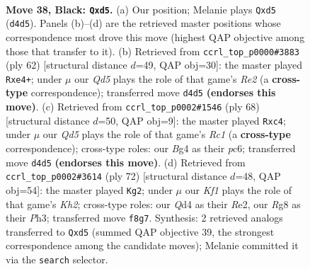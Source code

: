 \documentclass[11pt]{article}
\begin{document}
\clearpage

\begin{figure}[p]\centering
\begin{subfigure}{0.46\textwidth}\centering
\resizebox{\linewidth}{!}{%
\newchessgame
\chessboard[
  setfen={5kr1/p4p2/7p/2PBp1p1/3q2b1/8/P1K5/8 b - - 5 38},
  showmover=false,
  pgfstyle=straightmove, color=movearrow, markmove={d4-d5}
]}
\caption{}
\end{subfigure}\hfill
\begin{subfigure}{0.46\textwidth}\centering
\resizebox{\linewidth}{!}{%
\newchessgame
\chessboard[
  setfen={3r4/1p6/p3k2p/6p1/P3b3/1P6/2P1RKP1/8 w - - 0 32},
  showmover=false,
  pgfstyle=straightmove, color=movearrow, markmove={e2-e4}
]}
\caption{}
\end{subfigure}
\\[4pt]
\begin{subfigure}{0.46\textwidth}\centering
\resizebox{\linewidth}{!}{%
\newchessgame
\chessboard[
  setfen={5r2/2k5/p1p5/8/1Pb1pP2/P7/5P2/2R3K1 w - - 0 35},
  showmover=false,
  pgfstyle=straightmove, color=movearrow, markmove={c1-c4}
]}
\caption{}
\end{subfigure}\hfill
\begin{subfigure}{0.46\textwidth}\centering
\resizebox{\linewidth}{!}{%
\newchessgame
\chessboard[
  setfen={2r5/p7/6p1/3kb3/Np6/1P4PP/P3R2K/8 w - - 1 37},
  showmover=false,
  pgfstyle=straightmove, color=movearrow, markmove={h2-g2}
]}
\caption{}
\end{subfigure}
\caption{\textbf{Move 38, Black: \texttt{Qxd5}.} (a) Our position; Melanie plays \texttt{Qxd5} (\texttt{d4d5}). Panels (b)--(d) are the retrieved master positions whose correspondence most drove this move (highest QAP objective among those that transfer to it). (b) Retrieved from \texttt{ccrl\_top\_p0000\#3883} (ply 62) [structural distance $d$=49, QAP obj=30]: the master played \texttt{Rxe4+}; under $\mu$ our \emph{Qd5} plays the role of that game's \emph{Re2} (a \textbf{cross-type} correspondence); transferred move \texttt{d4d5} \textbf{(endorses this move)}. (c) Retrieved from \texttt{ccrl\_top\_p0002\#1546} (ply 68) [structural distance $d$=50, QAP obj=9]: the master played \texttt{Rxc4}; under $\mu$ our \emph{Qd5} plays the role of that game's \emph{Rc1} (a \textbf{cross-type} correspondence); cross-type roles: our \emph{B}g4 as their \emph{p}c6; transferred move \texttt{d4d5} \textbf{(endorses this move)}. (d) Retrieved from \texttt{ccrl\_top\_p0002\#3614} (ply 72) [structural distance $d$=48, QAP obj=54]: the master played \texttt{Kg2}; under $\mu$ our \emph{Kf1} plays the role of that game's \emph{Kh2}; cross-type roles: our \emph{Q}d4 as their \emph{R}e2, our \emph{R}g8 as their \emph{P}h3; transferred move \texttt{f8g7}. Synthesis: 2 retrieved analogs transferred to \texttt{Qxd5} (summed QAP objective 39, the strongest correspondence among the candidate moves); Melanie committed it via the \texttt{search} selector.}
\label{fig:thought-m75}
\end{figure}
\end{document}
